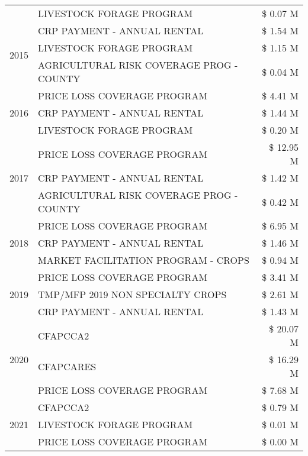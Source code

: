 \begin{tabular}{llr}
 & LIVESTOCK FORAGE PROGRAM & \$ 0.07 M \\
\cline{1-3}
\multirow[t]{3}{*}{2015} & CRP PAYMENT - ANNUAL RENTAL & \$ 1.54 M \\
 & LIVESTOCK FORAGE PROGRAM & \$ 1.15 M \\
 & AGRICULTURAL RISK COVERAGE PROG - COUNTY & \$ 0.04 M \\
\cline{1-3}
\multirow[t]{3}{*}{2016} & PRICE LOSS COVERAGE PROGRAM                   & \$ 4.41 M \\
 & CRP PAYMENT - ANNUAL RENTAL                   & \$ 1.44 M \\
 & LIVESTOCK FORAGE PROGRAM                      & \$ 0.20 M \\
\cline{1-3}
\multirow[t]{3}{*}{2017} & PRICE LOSS COVERAGE PROGRAM & \$ 12.95 M \\
 & CRP PAYMENT - ANNUAL RENTAL & \$ 1.42 M \\
 & AGRICULTURAL RISK COVERAGE PROG - COUNTY & \$ 0.42 M \\
\cline{1-3}
\multirow[t]{3}{*}{2018} & PRICE LOSS COVERAGE PROGRAM & \$ 6.95 M \\
 & CRP PAYMENT - ANNUAL RENTAL & \$ 1.46 M \\
 & MARKET FACILITATION PROGRAM - CROPS & \$ 0.94 M \\
\cline{1-3}
\multirow[t]{3}{*}{2019} & PRICE LOSS COVERAGE PROGRAM & \$ 3.41 M \\
 & TMP/MFP 2019 NON SPECIALTY CROPS & \$ 2.61 M \\
 & CRP PAYMENT - ANNUAL RENTAL & \$ 1.43 M \\
\cline{1-3}
\multirow[t]{3}{*}{2020} & CFAPCCA2 & \$ 20.07 M \\
 & CFAPCARES & \$ 16.29 M \\
 & PRICE LOSS COVERAGE PROGRAM & \$ 7.68 M \\
\cline{1-3}
\multirow[t]{3}{*}{2021} & CFAPCCA2 & \$ 0.79 M \\
 & LIVESTOCK FORAGE PROGRAM & \$ 0.01 M \\
 & PRICE LOSS COVERAGE PROGRAM & \$ 0.00 M \\
\cline{1-3}
\bottomrule
\end{tabular}
